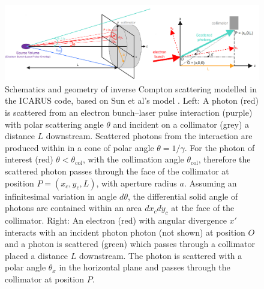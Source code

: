 \documentclass[../main.tex]{subfiles}
\begin{document}
\begin{figure}[!h]
\centering
\includegraphics[width=\textwidth]{Figures/Optimisation_and_Characterisation_of_Inverse_Compton_Scattering_Sources/collimator_geometry_solid_angle.pdf}
\caption{Schematics and geometry of inverse Compton scattering modelled in the \textsc{ICARUS} code, based on Sun et al's model \cite{sun2009characterizations,sun2011theoretical}. Left: A photon (red) is scattered from an electron bunch--laser pulse interaction (purple) with polar scattering angle $\theta$ and incident on a collimator (grey) a distance $L$ downstream. Scattered photons from the interaction are produced within in a cone of polar angle $\theta=1/\gamma$. For the photon of interest (red) $\theta < \theta_{\mathrm{col}}$, with the collimation angle $\theta_{\mathrm{col}}$, therefore the scattered photon passes through the face of the collimator at position $P = \left(x_{c},y_{c},L\right)$, with aperture radius $a$. Assuming an infinitesimal variation in angle $d\theta$, the differential solid angle of photons are contained within an area $dx_{c}dy_{c}$ at the face of the collimator. Right: An electron (red) with angular divergence $x'$ interacts with an incident photon photon (not shown) at position $O$ and a photon is scattered (green) which passes through a collimator placed a distance $L$ downstream. The photon is scattered with a polar angle $\theta_{x}$ in the horizontal plane and passes through the collimator at position $P$.}
\label{fig:solid_angle_collimator_geometry}
\end{figure}
\end{document}
